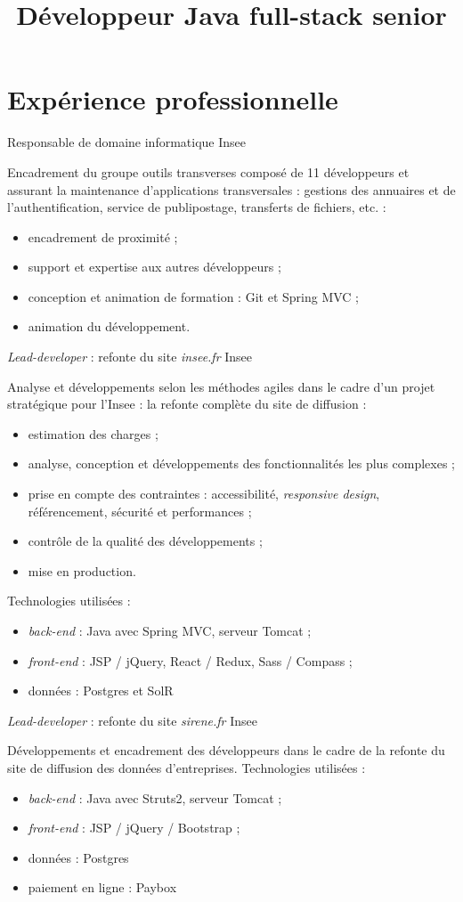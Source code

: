 \documentclass[11pt,a4paper,roman]{moderncv}       %
\title{Développeur Java full-stack senior}
\begin{document}
\makecvtitle



\section{Expérience professionnelle}\label{sec:expérience-professionnelle}

{Responsable de domaine informatique}
{Insee}
{}
{}
{Encadrement du groupe \og outils transverses \fg composé de 11 développeurs et assurant la maintenance d'applications transversales : gestions des annuaires et de l'authentification, service de publipostage, transferts de fichiers, etc. :
\begin{itemize}%
  \item encadrement de proximité ;
  \item support et expertise aux autres développeurs ;
  \item conception et animation de formation : Git et Spring MVC ;
  \item animation du développement.
\end{itemize}}

{\emph{Lead-developer} : refonte du site \emph{insee.fr}}
{Insee}
{}
{}
{Analyse et développements selon les méthodes agiles dans le cadre d'un projet stratégique pour l'Insee : la refonte complète du site de diffusion :
\begin{itemize}%
  \item estimation des charges ;
  \item analyse, conception et développements des fonctionnalités les plus complexes ;
  \item prise en compte des contraintes : accessibilité, \emph{responsive design}, référencement,  sécurité et performances ;
  \item contrôle de la qualité des développements ;
  \item mise en production.
\end{itemize}%
Technologies utilisées :
\begin{itemize}%
  \item \emph{back-end} : Java avec Spring MVC, serveur Tomcat ;
  \item \emph{front-end} : JSP / jQuery, React / Redux, Sass / Compass ;
  \item données : Postgres et SolR
\end{itemize}}

{\emph{Lead-developer} : refonte du site \emph{sirene.fr}}
{Insee}
{}
{}
{Développements et encadrement des développeurs dans le cadre de la refonte du site de diffusion des données d'entreprises.
\newline Technologies utilisées :
\begin{itemize}%
  \item \emph{back-end} : Java avec Struts2, serveur Tomcat ;
  \item \emph{front-end} : JSP / jQuery / Bootstrap ;
  \item données : Postgres
  \item paiement en ligne : Paybox
\end{itemize}}
\end{document}

